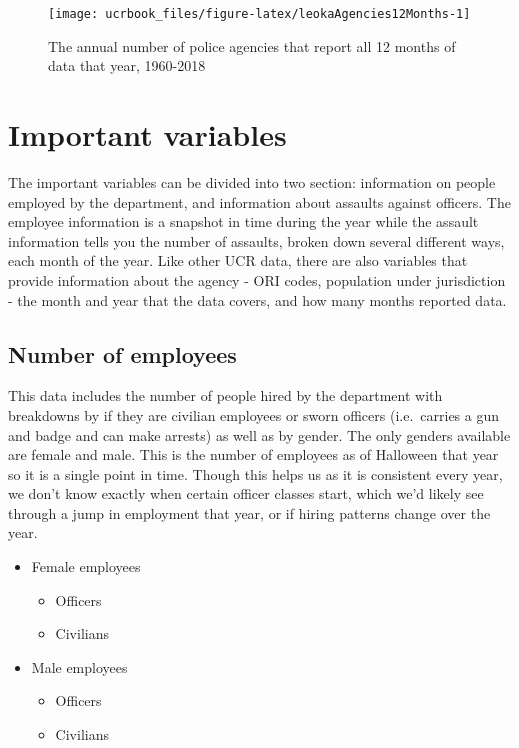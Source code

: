 \documentclass[
  12pt,
  openany]{book}
\providecommand{\tightlist}{%
  \setlength{\itemsep}{0pt}\setlength{\parskip}{0pt}}
\begin{document}
\begin{figure}

{\centering \texttt{[image: ucrbook\_files/figure-latex/leokaAgencies12Months-1]} 

}

\caption{The annual number of police agencies that report all 12 months of data that year, 1960-2018}\label{fig:leokaAgencies12Months}
\end{figure}

\hypertarget{important-variables-4}{%
\section{Important variables}\label{important-variables-4}}

The important variables can be divided into two section: information on people employed by the department, and information about assaults against officers. The employee information is a snapshot in time during the year while the assault information tells you the number of assaults, broken down several different ways, each month of the year. Like other UCR data, there are also variables that provide information about the agency - ORI codes, population under jurisdiction - the month and year that the data covers, and how many months reported data.

\hypertarget{number-of-employees}{%
\subsection{Number of employees}\label{number-of-employees}}

This data includes the number of people hired by the department with breakdowns by if they are civilian employees or sworn officers (i.e.~carries a gun and badge and can make arrests) as well as by gender. The only genders available are female and male. This is the number of employees as of Halloween that year so it is a single point in time. Though this helps us as it is consistent every year, we don't know exactly when certain officer classes start, which we'd likely see through a jump in employment that year, or if hiring patterns change over the year.

\begin{itemize}
\tightlist
\item
  Female employees

  \begin{itemize}
  \tightlist
  \item
    Officers
  \item
    Civilians
  \end{itemize}
\item
  Male employees

  \begin{itemize}
  \tightlist
  \item
    Officers
  \item
    Civilians
  \end{itemize}
\end{itemize}
\end{document}
